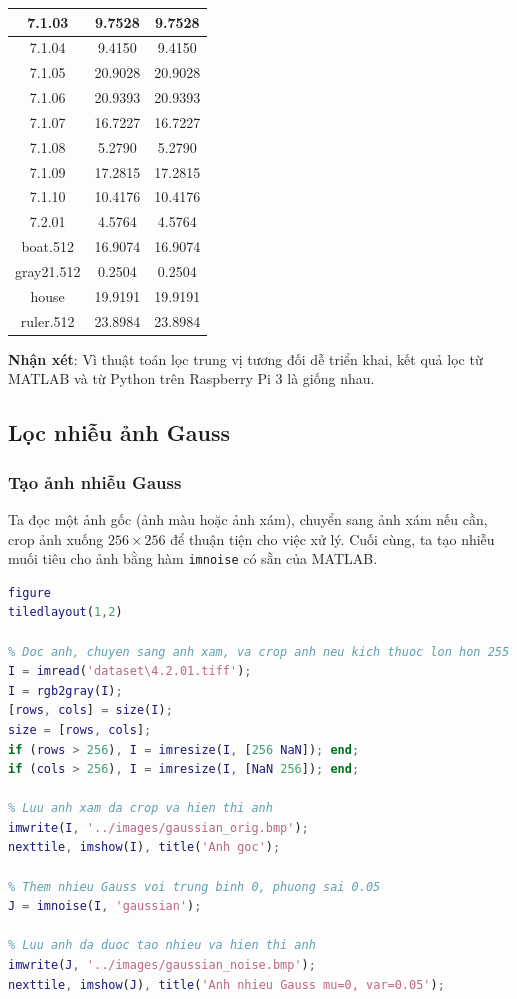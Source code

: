\begin{table}[H]
\begin{tabular}{|c|c|c|}
7.1.03 & 9.7528 & 9.7528 \\ \hline
7.1.04 & 9.4150 & 9.4150 \\ \hline
7.1.05 & 20.9028 & 20.9028 \\ \hline
7.1.06 & 20.9393 & 20.9393 \\ \hline
7.1.07 & 16.7227 & 16.7227 \\ \hline
7.1.08 & 5.2790 & 5.2790 \\ \hline
7.1.09 & 17.2815 & 17.2815 \\ \hline
7.1.10 & 10.4176 & 10.4176 \\ \hline
7.2.01 & 4.5764 & 4.5764 \\ \hline
boat.512 & 16.9074 & 16.9074 \\ \hline
gray21.512 & 0.2504 & 0.2504 \\ \hline
house & 19.9191 & 19.9191 \\ \hline
ruler.512 & 23.8984 & 23.8984 \\ \hline
\end{tabular}
\end{table}

\textbf{Nhận xét}: Vì thuật toán lọc trung vị tương đối dễ triển khai, 
kết quả lọc từ MATLAB và từ Python trên Raspberry Pi 3 là giống nhau.

\subsection{Lọc nhiễu ảnh Gauss}

\subsubsection{Tạo ảnh nhiễu Gauss}

Ta đọc một ảnh gốc (ảnh màu hoặc ảnh xám), chuyển sang ảnh xám nếu cần, crop ảnh xuống $256 \times 256$ để thuận tiện cho việc xử lý. Cuối cùng, ta tạo nhiễu muối tiêu cho ảnh bằng hàm \texttt{imnoise} có sẵn của MATLAB.

\begin{lstlisting}[language=MATLAB]
figure
tiledlayout(1,2)

% Doc anh, chuyen sang anh xam, va crop anh neu kich thuoc lon hon 255
I = imread('dataset\4.2.01.tiff');
I = rgb2gray(I);
[rows, cols] = size(I);
size = [rows, cols];
if (rows > 256), I = imresize(I, [256 NaN]); end;
if (cols > 256), I = imresize(I, [NaN 256]); end;

% Luu anh xam da crop va hien thi anh
imwrite(I, '../images/gaussian_orig.bmp');
nexttile, imshow(I), title('Anh goc');

% Them nhieu Gauss voi trung binh 0, phuong sai 0.05
J = imnoise(I, 'gaussian');

% Luu anh da duoc tao nhieu va hien thi anh
imwrite(J, '../images/gaussian_noise.bmp');
nexttile, imshow(J), title('Anh nhieu Gauss mu=0, var=0.05');
\end{lstlisting}

